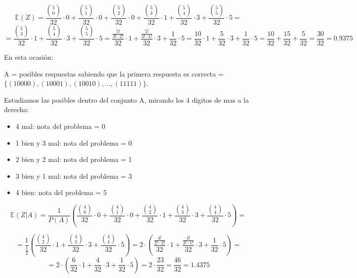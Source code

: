 \begin{problem}[3]
\[
\mathbb{E}(Z)=\frac{\binom{5}{0}}{32}\cdot0+\frac{\binom{5}{1}}{32}\cdot0+\frac{\binom{5}{2}}{32}\cdot0+\frac{\binom{5}{3}}{32}\cdot1+\frac{\binom{5}{4}}{32}\cdot3+\frac{\binom{5}{5}}{32}\cdot5=
\]
\[
=\frac{\binom{5}{3}}{32}\cdot1+\frac{\binom{5}{4}}{32}\cdot3+\frac{\binom{5}{5}}{32}\cdot5=\frac{\frac{5!}{3!\cdot 2!}}{32}\cdot1+\frac{\frac{5!}{4!\cdot 1!}}{32}\cdot3+\frac{1}{32}\cdot5=\frac{10}{32}\cdot1+\frac{5}{32}\cdot3+\frac{1}{32}\cdot5=\frac{10}{32}+\frac{15}{32}+\frac{5}{32}=\frac{30}{32}=0.9375
\]

\spart
En esta ocasión:

A = posibles respuestas sabiendo que la primera respuesta es correcta =$\{(10000), (10001), (10010),..., (11111)\}$.


Estudiamos las posibles dentro del conjunto A, mirando los 4 digitos de mas a la derecha:
\begin{itemize}
\item 4 mal: nota del problema = 0
\item 1 bien y 3 mal: nota del problema = 0
\item 2 bien y 2 mal: nota del problema = 1
\item 3 bien y 1 mal: nota del problema = 3
\item 4 bien: nota del problema = 5
\end{itemize}

\[
\mathbb{E}(Z|A)=\frac{1}{P(A)}\left( \frac{\binom{4}{0}}{32}\cdot0+\frac{\binom{4}{1}}{32}\cdot0+\frac{\binom{4}{2}}{32}\cdot1+\frac{\binom{4}{3}}{32}\cdot3+\frac{\binom{4}{4}}{32}\cdot5 \right)=
\]

\[
= \frac{1}{\frac{1}{2}}\left( \frac{\binom{4}{2}}{32}\cdot1+\frac{\binom{4}{3}}{32}\cdot3+\frac{\binom{4}{4}}{32}\cdot5\right)=
2\cdot \left( \frac{\frac{4!}{2!\cdot 2!}}{32}\cdot1+\frac{\frac{4!}{3!\cdot 1!}}{32}\cdot3+\frac{1}{32}\cdot5 \right) =
\]
\[
= 2\cdot \left(\frac{6}{32}\cdot1+\frac{4}{32}\cdot3+\frac{1}{32}\cdot5 \right) = 2 \cdot \frac{23}{32}=\frac{46}{32}=1.4375
\]


\end{problem}


